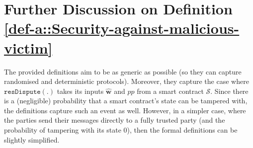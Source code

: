 \section{Further Discussion on Definition \ref{def-a::Security-against-malicious-victim}}\label{sec::Further-Discussion-on-Definition-Sec-against-victim}
\vspace{-1mm}

The provided definitions aim to be as generic as possible (so they can capture randomised and deterministic protocols). Moreover, they capture the case where $\mathtt{resDispute}(.)$ takes its inputs $\hat{\bm w}$ and  $pp$  from a smart contract $\mathcal{S}$. Since there is a (negligible) probability that a smart contract’s state can be tampered with, the definitions capture such an event as well. However, in a simpler case, where the parties send their messages directly to a  fully trusted party (and the probability of tampering with its state $0$), then the formal definitions can be slightly simplified. 












